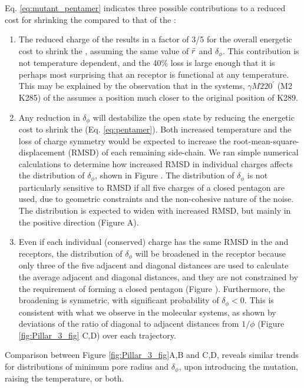 \documentclass[9pt,twocolumn,twoside,lineno]{pnas-new}
\begin{document}
Eq. \ref{eq:mutant_pentamer} indicates three possible contributions to a reduced cost for shrinking the \MT \fivering compared to that of the \WT \fiveringnos: 
\begin{enumerate}
\item The reduced charge of the \MT \fivering results in a factor of 3/5 for the overall energetic cost to shrink the \MT \fiveringnos, assuming the same value of $\bar{r}$ and $\delta_{\phi}$. This contribution is not temperature dependent, and the 40\% loss is large enough that it is perhaps most surprising that an \MT receptor is functional at any temperature. This may be explained by the observation that in the \MT systems, $\gamma M2 20^{\prime}$ (M2 K285) of the \triad assumes a position much closer to the original position of K289.   
\item  Any reduction in $\delta_{\phi}$ will destabilize the open state by reducing the energetic cost to shrink the \fiveringnos (Eq. \ref{eq:pentamer}).  Both increased temperature and the loss of charge symmetry would be expected to increase the root-mean-square-displacement (RMSD) of each remaining side-chain.  We ran simple numerical calculations to determine how increased RMSD in individual charges affects the distribution of $\delta_{\phi}$, shown in Figure \sfigDeltaPhiDist. The distribution of $\delta_{\phi}$ is not particularly sensitive to RMSD if all five charges of a closed pentagon are used, due to geometric constraints and the non-cohesive nature of the noise. The distribution is expected to widen with increased RMSD, but mainly in the positive direction (Figure \sfigDeltaPhiDist A). 
  \item Even if each individual (conserved) charge has the same RMSD in the \MT and \WT receptors, the distribution of $\delta_{\phi}$ will be broadened in the \MT receptor because only three of the five adjacent and diagonal distances are used to calculate the average adjacent and diagonal distances, and they are not constrained by the requirement of forming a closed pentagon (Figure \sfigDeltaPhiDist). Furthermore, the broadening is symmetric, with significant probability of $\delta_{\phi} < 0$. This is consistent with what we observe in the molecular systems, as shown by  deviations of the ratio of diagonal to adjacent distances from $1/\phi$ (Figure \ref{fig:Pillar_3_fig} C,D) over each trajectory.  
  \end{enumerate}
Comparison between Figure \ref{fig:Pillar_3_fig}A,B and C,D, reveals similar trends for distributions of minimum pore radius and $\delta_{\phi}$, upon introducing the mutation, raising the temperature, or both.   %
\end{document}
